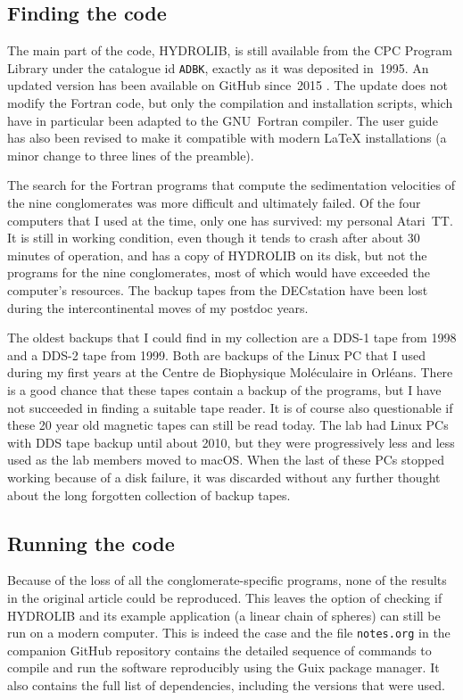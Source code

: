 \subsection*{Finding the code}

The main part of the code, HYDROLIB, is still available from the CPC Program Library \cite{CPCInternationalProgram2016} under the catalogue id \texttt{ADBK}, exactly as it was deposited in~1995. An updated version has been available on GitHub since~2015 \cite{HYDROLIB}. The update does not modify the Fortran code, but only the compilation and installation scripts, which have in particular been adapted to the GNU~Fortran compiler. The user guide has also been revised to make it compatible with modern LaTeX installations (a minor change to three lines of the preamble).

The search for the Fortran programs that compute the sedimentation velocities of the nine conglomerates was more difficult and ultimately failed. Of the four computers that I used at the time, only one has survived: my personal Atari~TT. It is still in working condition, even though it tends to crash after about 30 minutes of operation, and has a copy of HYDROLIB on its disk, but not the programs for the nine conglomerates, most of which would have exceeded the computer's resources. The backup tapes from the DECstation have been lost during the intercontinental moves of my postdoc years.

The oldest backups that I could find in my collection are a DDS-1 tape from 1998 and a DDS-2 tape from 1999. Both are backups of the Linux PC that I used during my first years at the Centre de Biophysique Moléculaire in Orléans. There is a good chance that these tapes contain a backup of the programs, but I have not succeeded in finding a suitable tape reader. It is of course also questionable if these 20 year old magnetic tapes can still be read today. The lab had Linux PCs with DDS tape backup until about 2010, but they were progressively less and less used as the lab members moved to macOS. When the last of these PCs stopped working because of a disk failure, it was discarded without any further thought about the long forgotten collection of backup tapes.

\subsection*{Running the code}

Because of the loss of all the conglomerate-specific programs, none of the results in the original article could be reproduced. This leaves the option of checking if HYDROLIB and its example application (a linear chain of spheres) can still be run on a modern computer. This is indeed the case and the file \texttt{notes.org} in the companion GitHub repository contains the detailed sequence of commands to compile and run the software reproducibly using the Guix package manager. It also contains the full list of dependencies, including the versions that were used.


